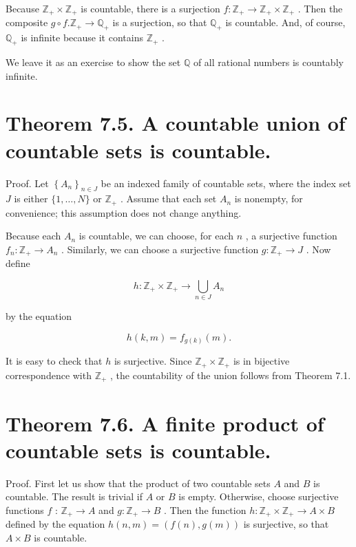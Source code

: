 Because \({\mathbb{Z}}_{ + } \times  {\mathbb{Z}}_{ + }\) is countable, there is a surjection \(f : {\mathbb{Z}}_{ + } \rightarrow  {\mathbb{Z}}_{ + } \times  {\mathbb{Z}}_{ + }\) . Then the composite \(g \circ  f.{\mathbb{Z}}_{ + } \rightarrow  {\mathbb{Q}}_{ + }\) is a surjection, so that \({\mathbb{Q}}_{ + }\) is countable. And, of course, \({\mathbb{Q}}_{ + }\) is infinite because it contains \({\mathbb{Z}}_{ + }\) .

We leave it as an exercise to show the set \(\mathbb{Q}\) of all rational numbers is countably infinite.

\section*{Theorem 7.5. A countable union of countable sets is countable.}

Proof. Let \({\left\{  {A}_{n}\right\}  }_{n \in  J}\) be an indexed family of countable sets, where the index set \(J\) is either \(\{ 1,\ldots ,N\}\) or \({\mathbb{Z}}_{ + }\) . Assume that each set \({A}_{n}\) is nonempty, for convenience; this assumption does not change anything.

Because each \({A}_{n}\) is countable, we can choose, for each \(n\) , a surjective function \({f}_{n} : {\mathbb{Z}}_{ + } \rightarrow  {A}_{n}\) . Similarly, we can choose a surjective function \(g : {\mathbb{Z}}_{ + } \rightarrow  J\) . Now define

\[
h : {\mathbb{Z}}_{ + } \times  {\mathbb{Z}}_{ + } \rightarrow  \mathop{\bigcup }\limits_{{n \in  J}}{A}_{n}
\]

by the equation

\[
h\left( {k,m}\right)  = {f}_{g\left( k\right) }\left( m\right) .
\]

It is easy to check that \(h\) is surjective. Since \({\mathbb{Z}}_{ + } \times  {\mathbb{Z}}_{ + }\) is in bijective correspondence with \({\mathbb{Z}}_{ + }\) , the countability of the union follows from Theorem 7.1.

\section*{Theorem 7.6. A finite product of countable sets is countable.}

Proof. First let us show that the product of two countable sets \(A\) and \(B\) is countable. The result is trivial if \(A\) or \(B\) is empty. Otherwise, choose surjective functions \(f\) : \({\mathbb{Z}}_{ + } \rightarrow  A\) and \(g : {\mathbb{Z}}_{ + } \rightarrow  B\) . Then the function \(h : {\mathbb{Z}}_{ + } \times  {\mathbb{Z}}_{ + } \rightarrow  A \times  B\) defined by the equation \(h\left( {n,m}\right)  = \left( {f\left( n\right) ,g\left( m\right) }\right)\) is surjective, so that \(A \times  B\) is countable.

